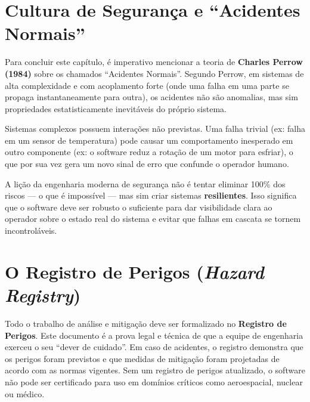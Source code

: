 \documentclass[12pt,a4paper]{report}
\begin{document}
\section{Cultura de Segurança e ``Acidentes Normais''}

Para concluir este capítulo, é imperativo mencionar a teoria de \textbf{Charles Perrow (1984)} sobre os chamados ``Acidentes Normais''. Segundo Perrow, em sistemas de alta complexidade e com acoplamento forte (onde uma falha em uma parte se propaga instantaneamente para outra), os acidentes não são anomalias, mas sim propriedades estatisticamente inevitáveis do próprio sistema.

Sistemas complexos possuem interações não previstas. Uma falha trivial (ex: falha em um sensor de temperatura) pode causar um comportamento inesperado em outro componente (ex: o software reduz a rotação de um motor para esfriar), o que por sua vez gera um novo sinal de erro que confunde o operador humano.

A lição da engenharia moderna de segurança não é tentar eliminar 100\% dos riscos --- o que é impossível --- mas sim criar sistemas \textbf{resilientes}. Isso significa que o software deve ser robusto o suficiente para dar visibilidade clara ao operador sobre o estado real do sistema e evitar que falhas em cascata se tornem incontroláveis.

\section{O Registro de Perigos (\textit{Hazard Registry})}

Todo o trabalho de análise e mitigação deve ser formalizado no \textbf{Registro de Perigos}. Este documento é a prova legal e técnica de que a equipe de engenharia exerceu o seu ``dever de cuidado''. Em caso de acidentes, o registro demonstra que os perigos foram previstos e que medidas de mitigação foram projetadas de acordo com as normas vigentes. Sem um registro de perigos atualizado, o software não pode ser certificado para uso em domínios críticos como aeroespacial, nuclear ou médico.
\end{document}
